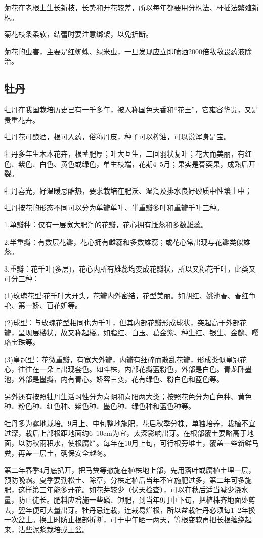 \documentclass{ctexbook}
\begin{document}
菊花在老根上生长新枝，长势和开花较差，所以每年都要用分株法、杆插法繁殖新株。

菊花枝条柔软，结蕾时要注意绑架，以免折断。

菊花的虫害，主要是红蜘蛛、绿米虫，一旦发现应立即喷洒2000倍敌敌畏药液除治。
\subsection{牡丹}
牡丹在我国栽培历史已有一千多年，被人称国色天香和“花王”，它雍容华贵，又是贵重花卉。

牡丹花可酿酒，根可入药，俗称丹皮，种子可以榨油，可以说浑身是宝。

牡丹多年生木本花卉，根茎肥厚；叶大互生，二回羽状复叶；花大而美丽，有红色、紫色、白色、黄色或绿色，单生枝端，花期4--5月；果实是蓇葖果，成熟后开裂。

牡丹喜光，好温暖忌酷热，要求栽培在肥沃、湿润及排水良好砂质中性壤土中；

牡丹按花的形态不同可以分为单瓣单叶、半重瓣多叶和重瓣千叶三种。

1.单瓣种：仅有一层宽大肥润的花瓣，花心拥有雌蕊和多数雄蕊。

2.半重瓣：有数层花瓣，花心拥有雌蕊和多数雄蕊；或花心常出现与花瓣类似雄蕊。

3.重瓣：花千叶(多层)，花心内所有雄蕊均变成花瓣状，所以又称花千叶，此类又可分三种：

(1)玫瑰花型:花千叶大开头，花瓣内外密结，花型美丽。如胡红、姚池春、春红争艳、第一娇、百花妒等。

(2)球型：与玫瑰花型相同也为千叶，但其内部花瓣形成球状，突起高于外部花瓣，呈现层楼状，故又称起楼。如脂红、白玉、葛金紫、种生红、银生、金麟、嘤珞宝珠等。

(3)皇冠型：花微重瓣，有宽大外瓣，内瓣有细碎而散乱花瓣，形成类似皇冠花心，往往在一朵上出现套色。如斗株，内部花瓣蓝粉色，外部是白色。青龙卧墨池，外部是墨瓣，内有青心。娇容三变，花有绿色、粉白色和蓝色等。

另外还有按照牡丹生活习性分为喜阴和喜阳两大类；按照花色分为白色种、黄色种、粉色种、红色种、紫色种、墨色种、绿色种和蓝色种等。

牡丹多为露地栽培。9月上、中旬整地施肥，花后秋季分株，单独培养，栽植不宜过深，栽后上部根距地面约6--10cm为宜，太深影响出芽。在根部覆土要略高于地面，以防秋雨积水，使根腐烂。每年在10月上旬，可行根旁堆土，覆盖一些新鲜马粪，再盖一层土，确保安全越冬。

第二年春季4月底扒开，把马粪等撤施在植株地上部，先用落叶或腐植土埋一层，预防晚霜。夏季要勤松土、除草，分株定植后当年不宜施肥过多，第二年可多施肥，这样第三年能多开花。如花芽较少（伏天检查），可以在秋后适当减少浇水量，防止徒长。肥料应增施一些磷、钾肥，到当年9月中下旬，把植株齐地面处剪去，翌年便可大量出芽。牡丹忌连栽，连栽易烂根，所以盆栽牡丹必须每1--2年换一次盆土。换土时防止根部折断，可于中午晒一两天，等根变软再把长根缠绕起来，沾些泥浆栽培或上盆。
\end{document}
